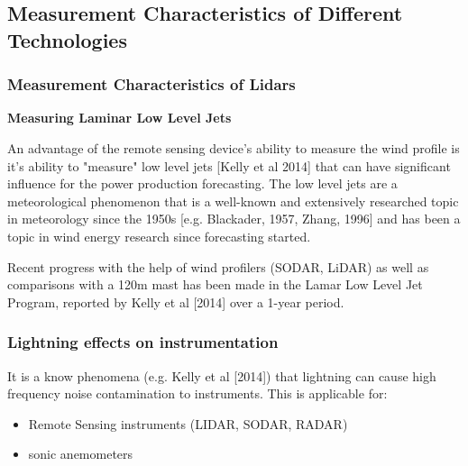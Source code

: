 \subsection{Measurement Characteristics of Different Technologies} \label{subsec:measurement-characteristics}

{\color{magenta}{Discussion of conceptual differences in measurements from anemometers on met masts (point measurements), remote sensing devices (lidar,sodar - which are some type of volume average) and nacelle mounted anemometers (very representative of height and location of turbines but obstructed). \\
}}
{\color{blue}{Questions:\\ Under 4.1.3 (Measurement Characteristics of different technologies), do we want to include solar-related measurements in this?  Ground-based pyranometer vs satellite-based estimate?
}}

\subsubsection{Measurement Characteristics of Lidars}

\textbf{Measuring Laminar Low Level Jets}

An advantage of the remote sensing device's ability to measure the wind profile is it's ability to "measure" low level jets [Kelly et al 2014] that can have significant influence for the power production forecasting. The low level jets are a meteorological phenomenon that is a well-known and extensively researched topic in meteorology since the 1950s [e.g. Blackader, 1957, Zhang, 1996] and has been a topic in wind energy research since forecasting started. 

Recent progress with the help of wind profilers (SODAR, LiDAR) as well as comparisons with a 120m mast has been made in the Lamar Low Level Jet Program, reported by Kelly et al [2014] over a 1-year period. 


\subsubsection{Lightning effects on instrumentation}

It is a know phenomena (e.g. Kelly et al [2014]) that lightning can cause high frequency noise contamination to instruments. 
This is applicable for: 
\begin{itemize}
    \item Remote Sensing instruments (LIDAR, SODAR, RADAR)
    \item sonic anemometers
\end{itemize}

